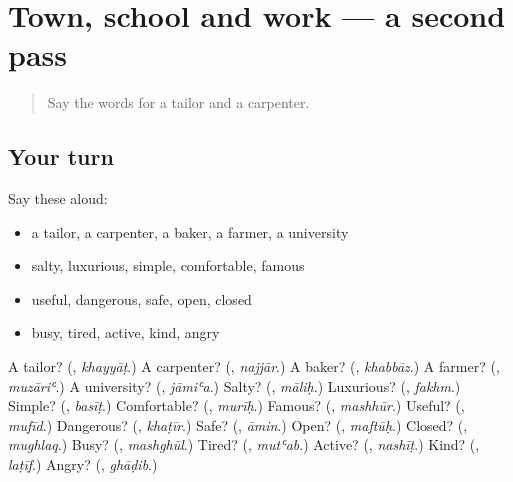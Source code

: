 \section[(dialogue)]{Town, school and work — a second pass}

\label{lesson:AR-R147-second-pass-town-school-and-work}



\begin{quote}
Say the words for a tailor and a carpenter.
\end{quote}

\subsection*{Your turn}
Say these aloud:

\begin{itemize}
\raggedright
  \item a tailor, a carpenter, a baker, a farmer, a university
  \item salty, luxurious, simple, comfortable, famous
  \item useful, dangerous, safe, open, closed
  \item busy, tired, active, kind, angry
\end{itemize}

\begin{tcolorbox}[breakable,colback=teal!4,colframe=teal!35!black,title={Before you move on}]
A tailor? (\textbf{}, \emph{khayyāṭ}.) A carpenter? (\textbf{}, \emph{najjār}.) A baker? (\textbf{}, \emph{khabbāz}.) A farmer? (\textbf{}, \emph{muzāriʿ}.) A university? (\textbf{}, \emph{jāmiʿa}.) Salty? (\textbf{}, \emph{māliḥ}.) Luxurious? (\textbf{}, \emph{fakhm}.) Simple? (\textbf{}, \emph{basīṭ}.) Comfortable? (\textbf{}, \emph{murīḥ}.) Famous? (\textbf{}, \emph{mashhūr}.) Useful? (\textbf{}, \emph{mufīd}.) Dangerous? (\textbf{}, \emph{khaṭīr}.) Safe? (\textbf{}, \emph{āmin}.) Open? (\textbf{}, \emph{maftūḥ}.) Closed? (\textbf{}, \emph{mughlaq}.) Busy? (\textbf{}, \emph{mashghūl}.) Tired? (\textbf{}, \emph{mutʿab}.) Active? (\textbf{}, \emph{nashīṭ}.) Kind? (\textbf{}, \emph{laṭīf}.) Angry? (\textbf{}, \emph{ghāḍib}.)
\end{tcolorbox}
